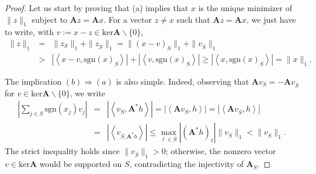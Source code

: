 \begin{proof}
    Let us start by proving that (a) implies that $x$ is the unique minimizer of $\|z\|_1$ subject to $\mathbf{A}z = \mathbf{A}x$. For a vector $z \neq x$ such that $\mathbf{A}z = \mathbf{A}x$, we just have to write, with $v := x-z \in \text{ker}\mathbf{A} \backslash \{0\}$,
    \begin{eqnarray*}
        \|z\|_1 &=& \|z_S\|_1 + \|z_{\overline{S}}\|_1 = \|(x-v)_S\|_1 + \|v_{\overline{S}}\|_1 \\
        &>& \left|\left<x - v, \text{sgn}(x)_S\right>\right| + \left|\left<v,\text{sgn}(x)_S\right>\right| \geq \left|\left<x, \text{sgn}(x)_S\right>\right| = \|x\|_1.
    \end{eqnarray*}

    The implication $(b) \Rightarrow (a)$ is also simple. Indeed, observing that $\mathbf{A}v_S = -\mathbf{A}v_{\overline{S}}$ for $v \in \text{ker}\mathbf{A} \backslash \{0\}$, we write
    \begin{eqnarray*}
        \left|\sum\limits_{j \in S}^{}\overline{\text{sgn}(x_j)}v_j\right| &=& \left|\left<v_S, \mathbf{A}^*h\right>\right| = \left|\left<\mathbf{A}v_S, h\right>\right| = \left|\left<\mathbf{A}v_{\overline{S}}, h\right>\right| \\
        &=& \left|\left<v_{\overline{S}, \mathbf{A}^*h}\right>\right| \leq \max\limits_{\ell \in \bar{S}}^{} \left|(\mathbf{A}^*h)_{\ell}\right| \|v_{\overline{S}}\|_1 < \|v_{\overline{S}}\|_1.
    \end{eqnarray*}
    The strict inequality holds since $\|v_{\overline{S}}\|_1 > 0$; otherwise, the nonzero vector $v \in \text{ker}\mathbf{A}$ would be supported on $S$, contradicting the injectivity of $\mathbf{A}_S$. 
    

\end{proof}
